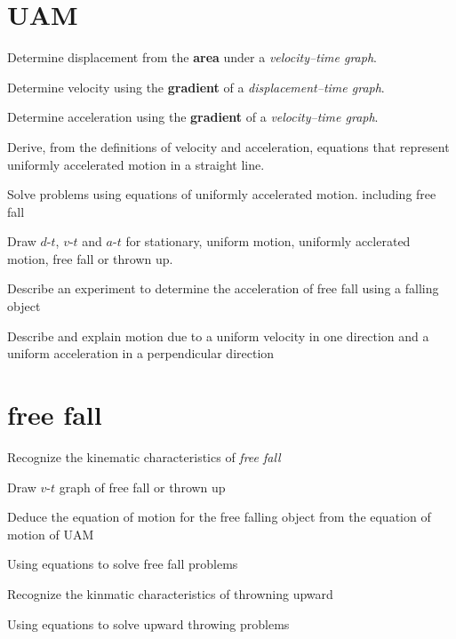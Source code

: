 \documentclass[a4paper]{tufte-handout}
\begin{document}
\section{UAM}
\begin{todolist}
  \item Determine displacement from the \textbf{area} under a \emph{velocity–time graph}.
  \item Determine velocity using the \textbf{gradient} of a \emph{displacement–time graph}.
  \item Determine acceleration using the \textbf{gradient} of a \emph{velocity–time graph}.
  \item Derive, from the definitions of velocity and acceleration, equations that represent uniformly accelerated motion in a straight line.
  \item Solve problems using equations of uniformly accelerated motion. including free fall
  \item Draw $d$-$t$, $v$-$t$ and $a$-$t$ for stationary, uniform motion, uniformly acclerated motion, free fall or thrown up. 
  \item Describe an experiment to determine the acceleration of free fall using a falling object
  \item Describe and explain motion due to a uniform velocity in one direction and a uniform acceleration in a perpendicular direction
\end{todolist}
\clearpage

\section{free fall}
\begin{todolist}
  \item Recognize the kinematic characteristics of \emph{free fall}
  \item Draw $v$-$t$ graph of free fall or thrown up
  \item Deduce the equation of motion for the free falling object from the equation of motion of UAM
  \item Using equations to solve free fall problems
  \item Recognize the kinmatic characteristics of throwning upward
  \item Using equations to solve upward throwing problems
\end{todolist}
\clearpage
\end{document}
